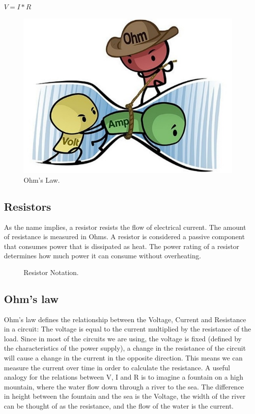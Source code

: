 $V=I*R$
\begin{figure}
	\centering
	\includegraphics{images/ohms_law_cartoon.png}
	\caption{Ohm's Law.} \label{ohms_law_cartoon:fig}
\end{figure}
\subsection{Resistors}
As the name implies, a resistor resists the flow of electrical current. The amount of resistance is measured in Ohms. A resistor is considered a passive component that consumes power that is dissipated as heat. The power rating of a resistor determines how much power it can consume without overheating.
\begin{figure}
    \centering
    
    \caption{Resistor Notation.} \label{fig:resistor}
\end{figure}
\newline
\subsection{ Ohm's law}
Ohm's law defines the relationship between the Voltage, Current and Resistance in a circuit: The voltage is equal to the current multiplied by the resistance of the load. Since in most of the circuits we are using, the voltage is fixed (defined by the characteristics of the power supply), a change in the resistance of the circuit will cause a change in the current in the opposite direction. This means we can measure the current over time in order to calculate the resistance.
A useful analogy for the relations between V, I and R is to imagine a fountain on a high mountain, where the water flow down through a river to the sea. The difference in height between the fountain and the sea is the Voltage, the width of the river can be thought of as the resistance, and the flow of the water is the current.
